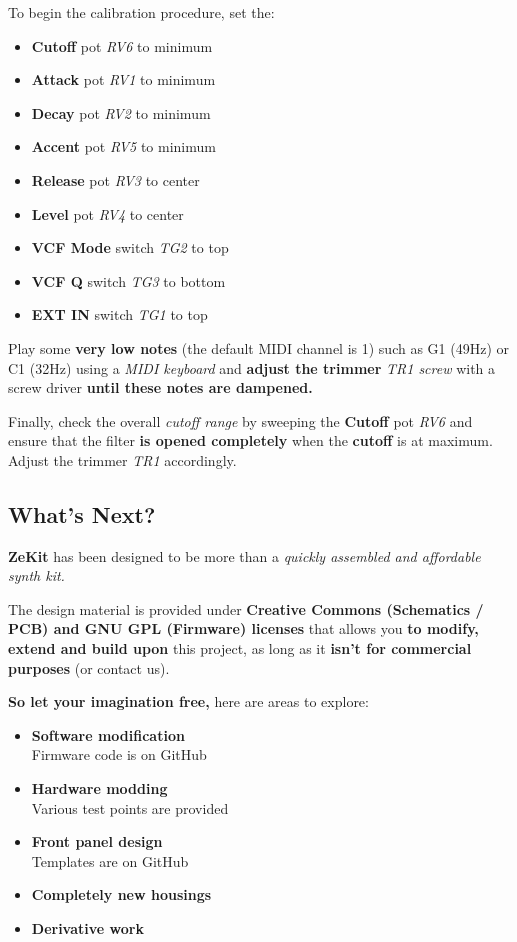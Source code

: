 \documentclass{scrartcl}
\begin{document}
To begin the calibration procedure, set the:
\begin{itemize}
    \item \textbf{Cutoff} pot \emph{RV6} to minimum
    \item \textbf{Attack} pot \emph{RV1} to minimum
    \item \textbf{Decay} pot \emph{RV2} to minimum
    \item \textbf{Accent} pot \emph{RV5} to minimum
    \item \textbf{Release} pot \emph{RV3} to center
    \item \textbf{Level} pot \emph{RV4} to center
    \item \textbf{VCF Mode} switch \emph{TG2} to top
    \item \textbf{VCF Q} switch \emph{TG3} to bottom
    \item \textbf{EXT IN} switch \emph{TG1} to top
\end{itemize}

\vspace{0.25cm}
Play some \textbf{very low notes} (the default MIDI channel is 1) such as G1 (49Hz) or C1 (32Hz) using a \emph{MIDI keyboard} and \textbf{adjust the trimmer} \emph{TR1 screw} with a screw driver \textbf{until these notes are dampened.}

Finally, check the overall \emph{cutoff range} by sweeping the \textbf{Cutoff} pot \emph{RV6} and ensure that the filter \textbf{is opened completely} when the \textbf{cutoff} is at maximum. Adjust the trimmer \emph{TR1} accordingly.

\pagebreak
\subsection{What's Next?}

\textbf{ZeKit} has been designed to be more than a \emph{quickly assembled and affordable synth kit.}

The design material is provided under \textbf{Creative Commons (Schematics / PCB) and GNU GPL (Firmware) licenses} that allows you \textbf{to modify, extend and build upon} this project,
as long as it \textbf{isn't for commercial purposes} (or contact us).

\textbf{So let your imagination free,} here are areas to explore:

\begin{itemize}
    \item \textbf{Software modification} \\
          Firmware code is on GitHub
    \item \textbf{Hardware modding} \\
          Various test points are provided
    \item \textbf{Front panel design} \\
          Templates are on GitHub
    \item \textbf{Completely new housings}
    \item \textbf{Derivative work}
\end{itemize}
\end{document}
